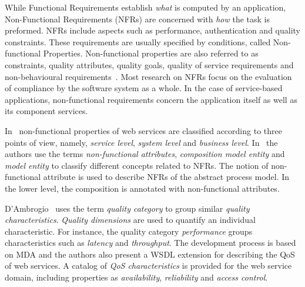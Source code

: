 While Functional Requirements establish \textit{what} is computed by an application, Non-Functional Requirements (NFRs) are concerned with \textit{how} the task is preformed.  
NFRs include aspects such as performance, authentication and quality constraints.
These requirements are usually specified by conditions, called Non-functional Properties.
Non-functional properties are also referred to as constraints, quality attributes, quality goals, quality of service requirements and non-behavioural requirements~\cite{Chung91,MylopoulosBook99,Chung2009}. 
Most research on NFRs focus on the evaluation of compliance by the software system as a whole. %
In the case of service-based applications, non-functional requirements concern the application itself as well as its component services. 

In~\cite{Babamir2010,Yeom2006} non-functional properties of web services are classified according to three points of view, namely,  
\textit{service level}, \textit{system level} and \textit{business level}.
In~\cite{XiaoCZBOLH08} the authors use the terms  
\textit{non-functional attributes}, \textit{composition mo\-del entity} and \textit{mo\-del entity}  to classify different concepts related to NFRs.
The notion of non-functional attribute is used to describe NFRs of the abstract process model. 
In the lower level, the composition is annotated with non-functional attributes.

D'Ambrogio~\cite{DAmbrogio06} uses the term \textit{quality category} to group similar \textit{quality characteristics}. 
\textit{Quality dimensions} are used to quantify an individual characteristic.
For instance, the quality category \textit{performance} groups characteristics such as
\textit{latency} and \textit{throughput}. 
The development process is based on MDA and the authors also present a WSDL extension for describing the QoS of web services. A catalog of \textit{QoS characteristics} is provided for the web service domain, including properties as \textit{availability}, \textit{reliability} and \textit{access control}. 


